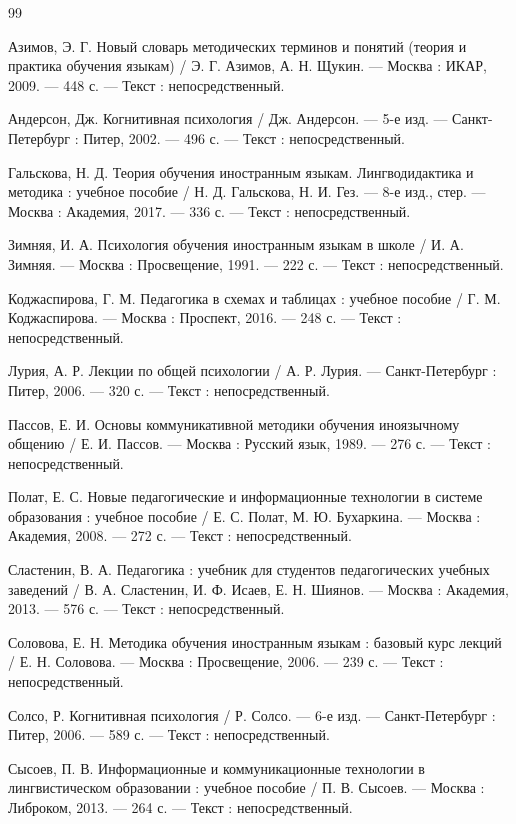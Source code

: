 \documentclass[11pt,a4paper,openany]{report}
\begin{document}
\begin{thebibliography}{99}

\bibitem{} Азимов, Э. Г. Новый словарь методических терминов и понятий (теория и практика обучения языкам) / Э. Г. Азимов, А. Н. Щукин. — Москва : ИКАР, 2009. — 448 с. — Текст : непосредственный.

\bibitem{} Андерсон, Дж. Когнитивная психология / Дж. Андерсон. — 5-е изд. — Санкт-Петербург : Питер, 2002. — 496 с. — Текст : непосредственный.

\bibitem{} Гальскова, Н. Д. Теория обучения иностранным языкам. Лингводидактика и методика : учебное пособие / Н. Д. Гальскова, Н. И. Гез. — 8-е изд., стер. — Москва : Академия, 2017. — 336 с. — Текст : непосредственный.

\bibitem{} Зимняя, И. А. Психология обучения иностранным языкам в школе / И. А. Зимняя. — Москва : Просвещение, 1991. — 222 с. — Текст : непосредственный.

\bibitem{} Коджаспирова, Г. М. Педагогика в схемах и таблицах : учебное пособие / Г. М. Коджаспирова. — Москва : Проспект, 2016. — 248 с. — Текст : непосредственный.

\bibitem{} Лурия, А. Р. Лекции по общей психологии / А. Р. Лурия. — Санкт-Петербург : Питер, 2006. — 320 с. — Текст : непосредственный.

\bibitem{} Пассов, Е. И. Основы коммуникативной методики обучения иноязычному общению / Е. И. Пассов. — Москва : Русский язык, 1989. — 276 с. — Текст : непосредственный.

\bibitem{} Полат, Е. С. Новые педагогические и информационные технологии в системе образования : учебное пособие / Е. С. Полат, М. Ю. Бухаркина. — Москва : Академия, 2008. — 272 с. — Текст : непосредственный.

\bibitem{} Сластенин, В. А. Педагогика : учебник для студентов педагогических учебных заведений / В. А. Сластенин, И. Ф. Исаев, Е. Н. Шиянов. — Москва : Академия, 2013. — 576 с. — Текст : непосредственный.

\bibitem{} Соловова, Е. Н. Методика обучения иностранным языкам : базовый курс лекций / Е. Н. Соловова. — Москва : Просвещение, 2006. — 239 с. — Текст : непосредственный.

\bibitem{} Солсо, Р. Когнитивная психология / Р. Солсо. — 6-е изд. — Санкт-Петербург : Питер, 2006. — 589 с. — Текст : непосредственный.

\bibitem{} Сысоев, П. В. Информационные и коммуникационные технологии в лингвистическом образовании : учебное пособие / П. В. Сысоев. — Москва : Либроком, 2013. — 264 с. — Текст : непосредственный.


\end{thebibliography}
\end{document}
